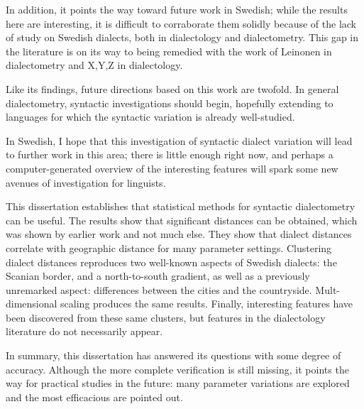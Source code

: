 In addition, it points the way toward future work in Swedish; while
the results here are interesting, it is difficult to corraborate them
solidly because of the lack of study on Swedish dialects, both in
dialectology and dialectometry. This gap in the literature is on its
way to being remedied with the work of Leinonen in dialectometry and
X,Y,Z in dialectology.

Like its findings, future directions based on this work are
twofold. In general dialectometry, syntactic investigations should
begin, hopefully extending to languages for which the syntactic
variation is already well-studied.

In Swedish, I hope that this investigation of syntactic dialect
variation will lead to further work in this area; there is little
enough right now, and perhaps a computer-generated overview of the
interesting features will spark some new avenues of investigation for
linguists.


This dissertation establishes that statistical methods for syntactic
dialectometry can be useful. The results show that significant
distances can be obtained, which was shown by earlier work and not
much else. They show that dialect distances correlate with geographic
distance for many parameter settings. Clustering dialect distances
reproduces two well-known aspects of Swedish dialects: the Scanian
border, and a north-to-south gradient, as well as a previously unremarked
aspect: differences between the cities and the
countryside. Mult-dimensional scaling produces the same
results. Finally, interesting features have been discovered from these
same clusters, but features in the dialectology literature do not
necessarily appear.

In summary, this dissertation has answered its questions with some
degree of accuracy. Although the more complete verification is still
missing, it points the way for practical studies in the future: many
parameter variations are explored and the most efficacious are pointed
out.

